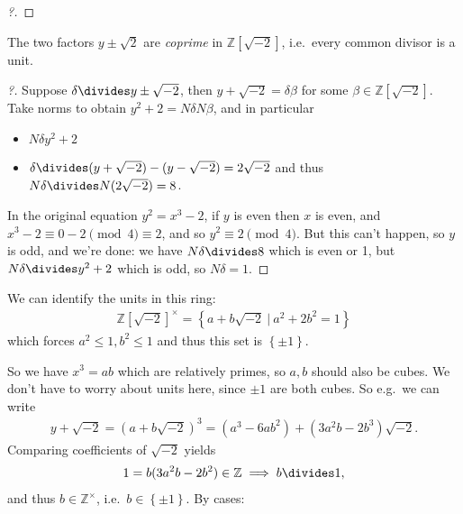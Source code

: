 \begin{example}[Fermat]
\begin{proof}[?]
\end{proof}

\begin{claim}

The two factors \(y \pm \sqrt 2\) are \emph{coprime} in
\({\mathbb{Z}}[\sqrt{-2}]\), i.e.~every common divisor is a unit.

\end{claim}

\begin{proof}[?]

Suppose \(\delta\divides y\pm \sqrt{-2}\), then
\(y + \sqrt{-2} = \delta \beta\) for some
\(\beta\in {\mathbb{Z}}[\sqrt{-2}]\). Take norms to obtain
\(y^2 + 2 = N \delta N \beta\), and in particular

\begin{itemize}
\tightlist
\item
  \(N \delta y^2 +2\)
\item
  \(\delta \divides (y+ \sqrt{-2} ) - (y - \sqrt{-2} ) = 2 \sqrt{-2}\)
  and thus \(N \delta \divides N(2 \sqrt{-2} ) = 8\).
\end{itemize}

In the original equation \(y^2 = x^3-2\), if \(y\) is even then \(x\) is
even, and \(x^3 - 2 \equiv 0-2 \pmod 4 \equiv 2\), and so
\(y^2 \equiv 2 \pmod 4\). But this can't happen, so \(y\) is odd, and
we're done: we have \(N \delta\divides 8\) which is even or 1, but
\(N \delta\divides y^2 +2\) which is odd, so \(N \delta = 1\).

\end{proof}

We can identify the units in this ring:
\begin{align*}
{\mathbb{Z}}[\sqrt{-2} ]^{\times}= \left\{{ a + b \sqrt{-2} {~\mathrel{\Big|}~}a^2 + 2b^2 = 1}\right\}
\end{align*}
which forces \(a^2 \leq 1, b^2 \leq 1\) and thus this set is
\(\left\{{\pm 1}\right\}\).

So we have \(x^3 = ab\) which are relatively primes, so \(a,b\) should
also be cubes. We don't have to worry about units here, since \(\pm 1\)
are both cubes. So e.g.~we can write
\begin{align*}
y + \sqrt{-2} = (a + b \sqrt{-2} )^3 = (a^3-6ab^2) + (3a^2b -2b^3) \sqrt{-2}
.\end{align*}
Comparing coefficients of \(\sqrt{-2}\) yields
\begin{align*} 1 = b(3a^2b - 2b^2) \in {\mathbb{Z}}\implies b \divides 1
,\end{align*}
and thus \(b\in {\mathbb{Z}}^{\times}\),
i.e.~\(b\in \left\{{\pm 1}\right\}\). By cases:


\end{example}
